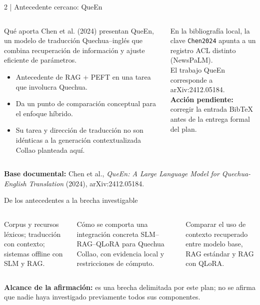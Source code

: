 \documentclass[aspectratio=169,10pt,spanish]{beamer}
\newcommand{\fuente}[1]{\vfill{\tiny\color{bpNavy!75}\textbf{Base documental:} #1}}
\begin{document}
\begin{frame}{2 | Antecedente cercano: QueEn}
\begin{columns}[T,onlytextwidth]
\begin{block}{Qué aporta}
\small Chen et al. (2024) presentan QueEn, un modelo de traducción Quechua--inglés que combina recuperación de información y ajuste eficiente de parámetros.
\begin{itemize}
  \item Antecedente de RAG + PEFT en una tarea que involucra Quechua.
  \item Da un punto de comparación conceptual para el enfoque híbrido.
  \item Su tarea y dirección de traducción no son idénticas a la generación contextualizada Collao planteada aquí.
\end{itemize}
\end{block}
\begin{tcolorbox}[colback=bpLightGray,colframe=bpRust,title={Verificación bibliográfica}]
\small En la bibliografía local, la clave \texttt{Chen2024} apunta a un registro ACL distinto (NewsPaLM).\\[2mm]
El trabajo QueEn corresponde a arXiv:2412.05184.\\[2mm]
\textbf{Acción pendiente:} corregir la entrada BibTeX antes de la entrega formal del plan.
\end{tcolorbox}
\end{columns}
\fuente{Chen et al., \emph{QueEn: A Large Language Model for Quechua-English Translation} (2024), arXiv:2412.05184.}
\end{frame}

\begin{frame}{De los antecedentes a la brecha investigable}
\centering
\begin{columns}[T,onlytextwidth]
\begin{tcolorbox}[colback=bpLightGray,colframe=bpBlue,title={Lo que existe}]
Corpus y recursos léxicos; traducción con contexto; sistemas offline con SLM y RAG.
\end{tcolorbox}
\begin{tcolorbox}[colback=bpLightGray,colframe=bpGold,title={Lo que falta comprobar}]
Cómo se comporta una integración concreta SLM--RAG--QLoRA para Quechua Collao, con evidencia local y restricciones de cómputo.
\end{tcolorbox}
\begin{tcolorbox}[colback=bpNavy,colframe=bpNavy,title={Foco evaluable}]
\color{white}Comparar el uso de contexto recuperado entre modelo base, RAG estándar y RAG con QLoRA.
\end{tcolorbox}
\end{columns}
\vspace{0.24cm}
\begin{tcolorbox}[colback=white,colframe=bpRust]
\centering\small\textbf{Alcance de la afirmación:} es una brecha delimitada por este plan; no se afirma que nadie haya investigado previamente todos sus componentes.
\end{tcolorbox}
\end{frame}
\end{document}
